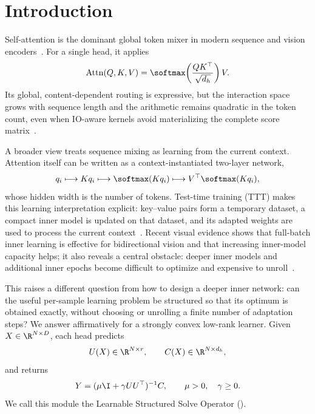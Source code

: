 \section{Introduction}

Self-attention is the dominant global token mixer in modern sequence and
vision encoders~\cite{vaswani2017attention,dosovitskiy2021vit}. For a single
head, it applies
\begin{equation}
  \operatorname{Attn}(Q,K,V)
  =\softmax\!\left(\frac{QK^\top}{\sqrt{d_h}}\right)V.
  \label{eq:attention}
\end{equation}
Its global, content-dependent routing is expressive, but the interaction space
grows with sequence length and the arithmetic remains quadratic in the token
count, even when IO-aware kernels avoid materializing the complete score
matrix~\cite{dao2022flashattention}.

A broader view treats sequence mixing as learning from the current context.
Attention itself can be written as a context-instantiated two-layer network,
\begin{equation}
  q_i \longmapsto Kq_i
  \longmapsto \softmax(Kq_i)
  \longmapsto V^\top\softmax(Kq_i),
  \label{eq:attention_dynamic_mlp}
\end{equation}
whose hidden width is the number of tokens. Test-time training (TTT) makes this
learning interpretation explicit: key--value pairs form a temporary dataset,
a compact inner model is updated on that dataset, and its adapted weights are
used to process the current context~\cite{sun2024ttt}. Recent visual evidence
shows that full-batch inner learning is effective for bidirectional vision and
that increasing inner-model capacity helps; it also reveals a central obstacle:
deeper inner models and additional inner epochs become difficult to optimize
and expensive to unroll~\cite{han2026vit3}.

This raises a different question from how to design a deeper inner network:
can the useful per-sample learning problem be structured so that its optimum is
obtained exactly, without choosing or unrolling a finite number of adaptation
steps? We answer affirmatively for a strongly convex low-rank learner. Given
$X\in\R^{N\times D}$, each head predicts
\[
  U(X)\in\R^{N\times r},
  \qquad
  C(X)\in\R^{N\times d_h},
\]
and returns
\begin{equation}
  Y=(\mu\I+\gamma UU^\top)^{-1}C,
  \qquad \mu>0,\quad \gamma\geq0.
  \label{eq:lsso_intro}
\end{equation}
We call this module the Learnable Structured Solve Operator (\LSSO).


